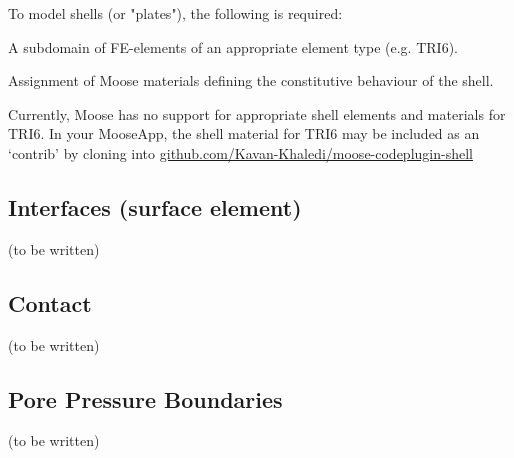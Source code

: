 To model shells (or "plates"), the following is required:

\begin{description}[font=$\bullet$~\normalfont]
    \item [subdomain:] A subdomain of FE-elements of an appropriate element type (e.g. TRI6).
    \item [materials:] Assignment of Moose materials defining the constitutive behaviour of the shell.
\end{description}

Currently, Moose has no support for appropriate shell elements and materials for TRI6. In your MooseApp, the shell material for TRI6 may be included as an ‘contrib’ by cloning into
\href{https://github.com/Kavan-Khaledi/moose-codeplugin-shell}{github.com/Kavan-Khaledi/moose-codeplugin-shell}

\subsection{Interfaces (surface element)}

(to be written)

\subsection{Contact}

(to be written)

\subsection{Pore Pressure Boundaries}

(to be written)